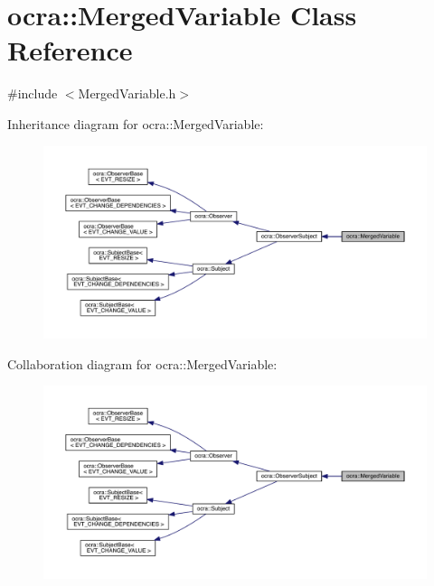 \hypertarget{classocra_1_1MergedVariable}{}\section{ocra\+:\+:Merged\+Variable Class Reference}
\label{classocra_1_1MergedVariable}


{\ttfamily \#include $<$Merged\+Variable.\+h$>$}



Inheritance diagram for ocra\+:\+:Merged\+Variable\+:\nopagebreak
\begin{figure}[H]
\begin{center}
\leavevmode
\includegraphics[width=350pt]{d4/da6/classocra_1_1MergedVariable__inherit__graph}
\end{center}
\end{figure}


Collaboration diagram for ocra\+:\+:Merged\+Variable\+:\nopagebreak
\begin{figure}[H]
\begin{center}
\leavevmode
\includegraphics[width=350pt]{d7/d8b/classocra_1_1MergedVariable__coll__graph}
\end{center}
\end{figure}
